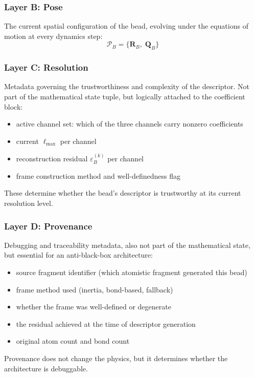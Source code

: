 \documentclass[11pt]{article}
\begin{document}
\subsubsection{Layer B: Pose}

The current spatial configuration of the bead, evolving under the equations
of motion at every dynamics step:
\begin{equation}
    \mathcal{P}_B = \bigl\{ \mathbf{R}_B,\; \mathbf{Q}_B \bigr\}
\end{equation}

\subsubsection{Layer C: Resolution}

Metadata governing the trustworthiness and complexity of the descriptor.
Not part of the mathematical state tuple, but logically attached to the
coefficient block:
\begin{itemize}
    \item active channel set: which of the three channels carry nonzero
          coefficients
    \item current $\ell_{\max}$ per channel
    \item reconstruction residual $\varepsilon_B^{(k)}$ per channel
    \item frame construction method and well-definedness flag
\end{itemize}
These determine whether the bead's descriptor is trustworthy at its current
resolution level.

\subsubsection{Layer D: Provenance}

Debugging and traceability metadata, also not part of the mathematical
state, but essential for an anti-black-box architecture:
\begin{itemize}
    \item source fragment identifier (which atomistic fragment generated
          this bead)
    \item frame method used (inertia, bond-based, fallback)
    \item whether the frame was well-defined or degenerate
    \item the residual achieved at the time of descriptor generation
    \item original atom count and bond count
\end{itemize}
Provenance does not change the physics, but it determines whether the
architecture is debuggable.
\end{document}
